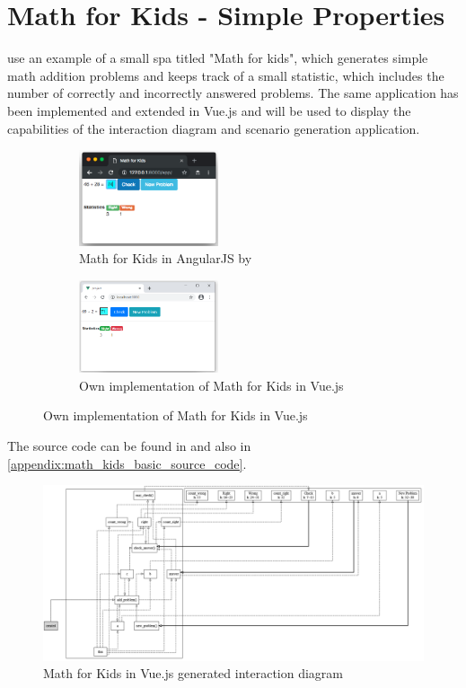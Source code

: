 \section{Math for Kids - Simple Properties}
\textcite{zhang2019scenario} use an example of a small \gls{spa} titled "Math for kids", which generates simple math addition problems and keeps track of a small statistic, which includes the number of correctly and incorrectly answered problems. The same application has been implemented and extended in Vue.js and will be used to display the capabilities of the interaction diagram and scenario generation application.

\begin{figure}[H]
    \centering
    \begin{subfigure}[b]{0.45\textwidth}
         \centering
         \includegraphics[width=0.45\textwidth]{images/math_for_kids_zhang.png}
         \caption{Math for Kids in AngularJS by \textcite{zhang2019scenario}}
    \end{subfigure}\hfill%
    \begin{subfigure}[b]{0.45\textwidth}
        \centering
        \includegraphics[width=0.45\textwidth]{images/math_for_kids_own.png}
        \caption{Own implementation of Math for Kids in Vue.js}
    \end{subfigure}
\end{figure}

The source code can be found in  and also in \ref{appendix:math_kids_basic_source_code}.
\begin{figure}[H]
    \includegraphics[width=\textwidth]{images/diagram_own_math_kids.png}
     \caption{Math for Kids in Vue.js generated interaction diagram }
     \label{fig:math_for_kids_own_interaction_diagram}
\end{figure}

